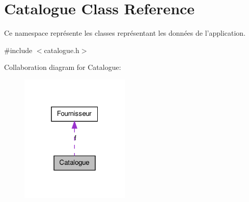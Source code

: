 \hypertarget{class_catalogue}{
\section{Catalogue Class Reference}
\label{db/d2b/class_catalogue}
}


Ce namespace représente les classes représentant les données de l'application.  




{\ttfamily \#include $<$catalogue.h$>$}



Collaboration diagram for Catalogue:\nopagebreak
\begin{figure}[H]
\begin{center}
\leavevmode
\includegraphics[width=148pt]{d3/d19/class_catalogue__coll__graph}
\end{center}
\end{figure}
